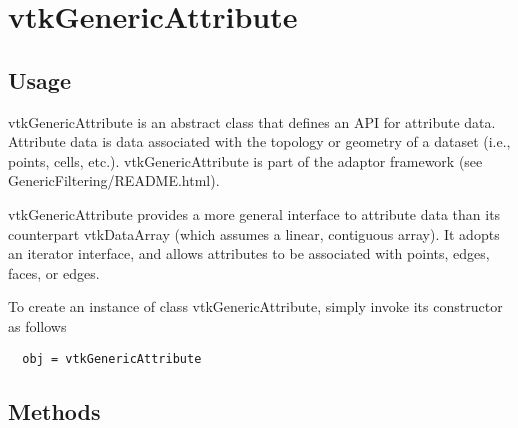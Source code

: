 \section{vtkGenericAttribute}

\subsection{Usage}

 vtkGenericAttribute is an abstract class that defines an API for attribute
 data. Attribute data is data associated with the topology or geometry of
 a dataset (i.e., points, cells, etc.). vtkGenericAttribute is part of the
 adaptor framework (see GenericFiltering/README.html).

 vtkGenericAttribute provides a more general interface to attribute data
 than its counterpart vtkDataArray (which assumes a linear, contiguous
 array). It adopts an iterator interface, and allows attributes to be
 associated with points, edges, faces, or edges.

To create an instance of class vtkGenericAttribute, simply
invoke its constructor as follows
\begin{verbatim}
  obj = vtkGenericAttribute
\end{verbatim}
\subsection{Methods}

